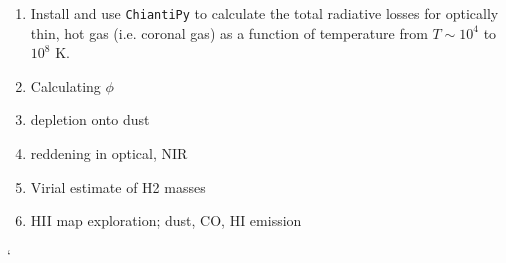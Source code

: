 \begin{enumerate}
\item Install and use {\tt ChiantiPy} to calculate the total radiative
losses for optically thin, hot gas (i.e. coronal gas) as a function of
temperature from $T \sim 10^4$ to $10^8$ K.
\item Calculating $\phi$
\item depletion onto dust
\item reddening  in optical, NIR
\item Virial estimate of H2 masses
\item HII map exploration; dust, CO, HI emission
\end{enumerate}`


  
